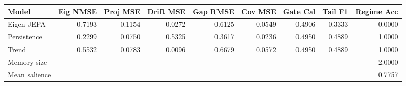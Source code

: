 \begin{tabular}{lrrrrrrrr}
\toprule
Model & Eig NMSE & Proj MSE & Drift MSE & Gap RMSE & Cov MSE & Gate Cal & Tail F1 & Regime Acc \\
\midrule
Eigen-JEPA & 0.7193 & 0.1154 & 0.0272 & 0.6125 & 0.0549 & 0.4906 & 0.3333 & 0.0000 \\
Persistence & 0.2299 & 0.0750 & 0.5325 & 0.3617 & 0.0236 & 0.4950 & 0.4889 & 1.0000 \\
Trend & 0.5532 & 0.0783 & 0.0096 & 0.6679 & 0.0572 & 0.4950 & 0.4889 & 1.0000 \\
\midrule
Memory size & \multicolumn{8}{r}{2.0000} \\
Mean salience & \multicolumn{8}{r}{0.7757} \\
\bottomrule
\end{tabular}